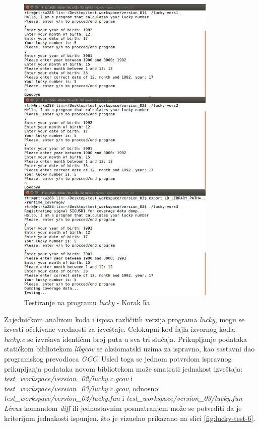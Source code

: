 \documentclass[12pt,oneside]{memoir}
\newcommand{\strano}[1]{\textit{#1}}
\begin{document}
\begin{figure}[!ht]
  \centering
  \includegraphics[width=0.85\textwidth]{img/lucky5-ng.png}
  \caption{Testiranje na programu \strano{lucky} - Korak 5a}
  \label{fig:lucky-test-5}
\end{figure}

Zajedničkom analizom koda i ispisa različitih verzija programa \strano{lucky}, mogu se izvesti očekivane vrednosti za izveštaje. Celokupni kod fajla izvornog koda: \strano{lucky.c} se izvršava identičan broj puta u sva tri slučaja. Prikupljanje podataka statičkom bibliotekom \strano{libgcov} se aksiomatski uzima za ispravno, kao sastavni dao programskog prevodioca \strano{GCC}. Usled toga se jednom potvrdom ispravnog prikupljanja podataka novom bibliotekom može smatrati jednakost izveštaja: \\ \strano{test\_workspace/version\_02/lucky.c.gcov} i \strano{test\_workspace/version\_03/lucky.c.gcov}, odnosno: \\
\strano{test\_workspace/version\_02/lucky.fun} i \strano{test\_workspace/version\_03/lucky.fun}  \\
\strano{Linux} komandom \strano{diff} ili jednostavnim posmatranjem može se potvrditi da je kriterijum jednakosti ispunjen, što je vizuelno prikazano na slici \ref{fig:lucky-test-6}.
\end{document}
